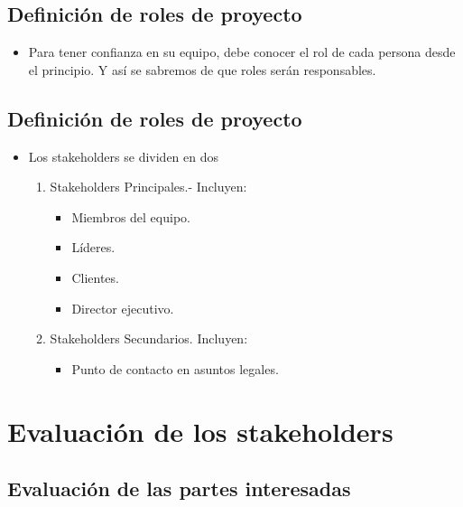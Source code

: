 \documentclass[10pt]{book}
\begin{document}
	\subsection{Definición de roles de proyecto}
	\begin{itemize}
	    \item Para tener confianza en su equipo, debe conocer el rol de cada persona desde el principio. Y así se sabremos de que roles serán responsables.
	\end{itemize}

	\subsection{Definición de roles de proyecto}
	\begin{itemize}
	    \item Los stakeholders se dividen en dos
	    \begin{enumerate}[1.]
		\item Stakeholders Principales.- Incluyen:
		\begin{itemize}
		    \item Miembros del equipo.
		    \item Líderes.
		    \item Clientes.
		    \item Director ejecutivo.
		\end{itemize}
		\item Stakeholders Secundarios. Incluyen:
		\begin{itemize}
		    \item Punto de contacto en asuntos legales.
		\end{itemize}
	    \end{enumerate}

	\end{itemize}

    \section{Evaluación de los stakeholders}

	\subsection{Evaluación de las partes interesadas}
\end{document}
